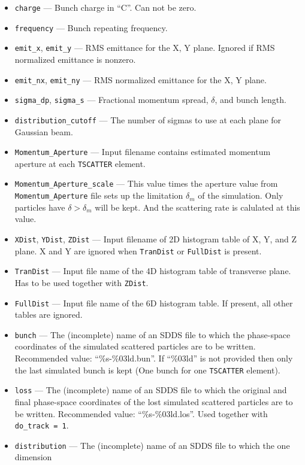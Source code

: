 \documentclass[11pt]{article}
\begin{document}
\begin{itemize}
   \item \verb|charge| --- Bunch charge in ``C''. Can not be zero.
   \item \verb|frequency| --- Bunch repeating frequency.
   \item \verb|emit_x|, \verb|emit_y| --- RMS emittance for the X, Y plane. Ignored 
   if RMS normalized emittance is nonzero.
   \item \verb|emit_nx|, \verb|emit_ny| --- RMS normalized emittance for the X, Y plane.
   \item \verb|sigma_dp|, \verb|sigma_s| --- Fractional momentum spread, $\delta$, and bunch length.
   \item \verb|distribution_cutoff| --- The number of sigmas to use at each plane for Gaussian beam.
   \item \verb|Momentum_Aperture| --- Input filename contains estimated momentum aperture at each
   \verb|TSCATTER| element.
   \item \verb|Momentum_Aperture_scale| --- This value times the aperture value from \verb|Momentum_Aperture|
   file sets up the limitation $\delta_m$ of the simulation. Only particles have $\delta>\delta_m$ 
   will be kept. And the scattering rate is calulated at this value.
   \item \verb|XDist|, \verb|YDist|, \verb|ZDist| --- Input filename of 2D histogram table of X, Y, and Z plane. 
   X and Y are ignored when \verb|TranDist| or \verb|FullDist| is present. 
   \item \verb|TranDist| --- Input file name of the 4D histogram table of transverse plane. 
   Has to be used together with \verb|ZDist|.
   \item \verb|FullDist| --- Input file name of the 6D histogram table. If present, all other 
   tables are ignored.
   \item \verb|bunch| --- The (incomplete) name of an SDDS file to which the phase-space coordinates of 
   the simulated scattered particles are to be written. Recommended value: ``\%s-\%03ld.bun''. If ``\%03ld''
   is not provided then only the last simulated bunch is kept (One bunch for one \verb|TSCATTER| element).
   \item \verb|loss| --- The (incomplete) name of an SDDS file to which the original and final 
   phase-space coordinates of the lost simulated scattered particles are to be written. 
   Recommended value: ``\%s-\%03ld.los''. Used together with \verb|do_track = 1|.
   \item \verb|distribution| --- The (incomplete) name of an SDDS file to which the one dimension 

\end{itemize}
\end{document}
